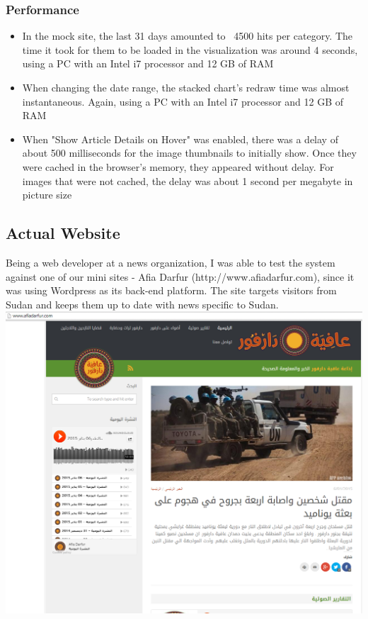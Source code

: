 \documentclass[12pt]{article}
\begin{document}
\subsubsection{Performance}
\begin{itemize}
\item In the mock site, the last 31 days amounted to ~4500 hits per category. The time it took for them to be loaded in the visualization was around 4 seconds, using a PC with an Intel i7 processor and 12 GB of RAM
\item When changing the date range, the stacked chart's redraw time was almost instantaneous. Again, using a PC with an Intel i7 processor and 12 GB of RAM
\item When "Show Article Details on Hover" was enabled, there was a delay of about 500 milliseconds for the image thumbnails to initially show. Once they were cached in the browser's memory, they appeared without delay. For images that were not cached, the delay was about 1 second per megabyte in picture size
\end{itemize}

\newpage

\subsection{Actual Website}
Being a web developer at a news organization, I was able to test the system against one of our mini sites - Afia Darfur (http://www.afiadarfur.com), since it was using Wordpress as its back-end platform. The site targets visitors from Sudan and keeps them up to date with news specific to Sudan. \\

\noindent\includegraphics[scale=0.4]{img/afiadarfur_main} \\
\end{document}
